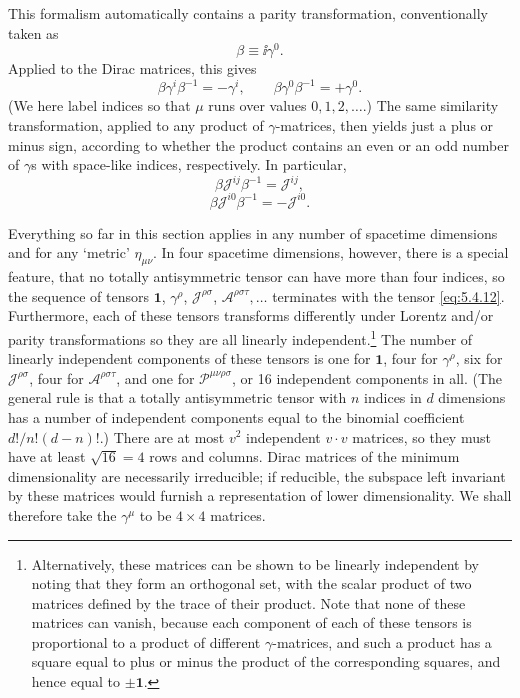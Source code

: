 This formalism automatically contains a parity transformation, conventionally
taken as
\begin{equation}
\beta\equiv \ii\gamma^0.
\tag{5.4.13}\label{eq:5.4.13}
\end{equation}
Applied to the Dirac matrices, this gives
\begin{equation}
\beta\gamma^i\beta^{-1}=-\gamma^i,
\qquad
\beta\gamma^0\beta^{-1}=+\gamma^0.
\tag{5.4.14}\label{eq:5.4.14}
\end{equation}
(We here label indices so that $\mu$ runs over values $0,1,2,\ldots$.) The same
similarity transformation, applied to any product of $\gamma$-matrices, then
yields just a plus or minus sign, according to whether the product contains an
even or an odd number of $\gamma$s with space-like indices, respectively. In
particular,
\begin{equation}
\beta\mathcal{J}^{ij}\beta^{-1}=\mathcal{J}^{ij},
\tag{5.4.15}\label{eq:5.4.15}
\end{equation}
\begin{equation}
\beta\mathcal{J}^{i0}\beta^{-1}=-\mathcal{J}^{i0}.
\tag{5.4.16}\label{eq:5.4.16}
\end{equation}

Everything so far in this section applies in any number of spacetime
dimensions and for any `metric' $\eta_{\mu\nu}$. In four spacetime dimensions,
however, there is a special feature, that no totally antisymmetric tensor can
have more than four indices, so the sequence of tensors $\mathbf{1}$,
$\gamma^\rho$, $\mathcal{J}^{\rho\sigma}$,
$\mathcal{A}^{\rho\sigma\tau},\ldots$ terminates with the tensor \eqref{eq:5.4.12}.
Furthermore, each of these tensors transforms differently under Lorentz and/or
parity transformations so they are all linearly independent.\footnote{Alternatively,
these matrices can be shown to be linearly independent by noting that they
form an orthogonal set, with the scalar product of two matrices defined by the
trace of their product. Note that none of these matrices can vanish, because
each component of each of these tensors is proportional to a product of
different $\gamma$-matrices, and such a product has a square equal to plus or
minus the product of the corresponding squares, and hence equal to
$\mathbin{\pm}\mathbf{1}$.} The number of linearly independent components of
these tensors is one for $\mathbf{1}$, four for $\gamma^\rho$, six for
$\mathcal{J}^{\rho\sigma}$, four for $\mathcal{A}^{\rho\sigma\tau}$, and one
for $\mathcal{P}^{\mu\nu\rho\sigma}$, or 16 independent components in all.
(The general rule is that a totally antisymmetric tensor with $n$ indices in
$d$ dimensions has a number of independent components equal to the binomial
coefficient $d!/n!(d-n)!$.) There are at most $v^2$ independent $v\cdot v$
matrices, so they must have at least $\sqrt{16}=4$ rows and columns. Dirac
matrices of the minimum dimensionality are necessarily irreducible; if
reducible, the subspace left invariant by these matrices would furnish a
representation of lower dimensionality. We shall therefore take the
$\gamma^\mu$ to be $4\times4$ matrices.

